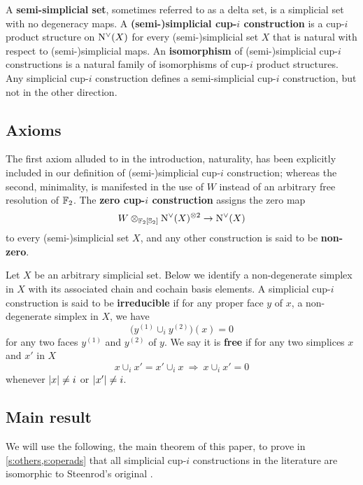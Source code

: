 A \textbf{semi-simplicial set}, sometimes referred to as a delta set, is a simplicial set with no degeneracy maps.
A \textbf{(semi-)simplicial \mbox{cup-$i$} construction} is a \mbox{cup-$i$} product structure on $\operatorname{N^{\vee}}(X)$ for every (semi-)simplicial set $X$ that is natural with respect to (semi-)simplicial maps.
An \textbf{isomorphism} of (semi-)simplicial \mbox{cup-$i$} constructions is a natural family of isomorphisms of cup-$i$ product structures.
Any simplicial cup-$i$ construction defines a semi-simplicial cup-$i$ construction, but not in the other direction.

\subsection{Axioms}

The first axiom alluded to in the introduction, naturality, has been explicitly included in our definition of (semi-)simplicial \mbox{cup-$i$} construction; whereas the second, minimality, is manifested in the use of $W$ instead of an arbitrary free resolution of ${\mathbb{F}_2}$.
The \textbf{zero cup-$i$ construction} assigns the zero map
\[
W \otimes_{{\mathbb{F}_2}[\mathbb{S}_2]} \operatorname{N^{\vee}}(X)^{\otimes 2} \to \operatorname{N^{\vee}}(X)
\]
to every (semi-)simplicial set $X$, and any other construction is said to be \textbf{non-zero}.



Let $X$ be an arbitrary simplicial set.
Below we identify a non-degenerate simplex in $X$ with its associated chain and cochain basis elements.
A simplicial cup-$i$ construction is said to be \textbf{irreducible} if for any proper face $y$ of $x$, a non-degenerate simplex in $X$, we have
\[
\boxed{\Big( y^{(1)} \cup_{i} y^{(2)} \Big)(x) = 0}
\]
for any two faces $y^{(1)}$ and $y^{(2)}$ of $y$.
We say it is \textbf{free} if for any two simplices $x$ and $x'$ in $X$
\[
\boxed{x \cup_{i} x' = x' \cup_{i} x} \
\Longrightarrow \
\boxed{x \cup_{i} x' = 0}
\]
whenever $\lvert x\rvert \neq i$ or $\lvert x'\rvert \neq i$.

\subsection{Main result}

We will use the following, the main theorem of this paper, to prove in \cref{s:others,s:operads} that all simplicial \mbox{cup-$i$} constructions in the literature are isomorphic to Steenrod's original \cite{steenrod1947products}.


